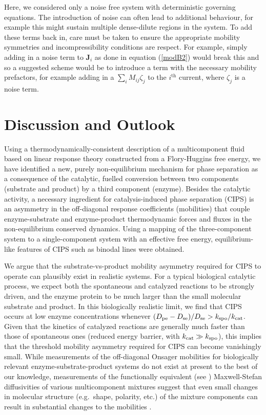 Here, we considered only a noise free system with deterministic governing equations. The introduction of noise can often lead to additional behaviour, for example this might sustain multiple dense-dilute regions in the system. To add these terms back in, care must be taken to ensure the appropriate mobility symmetries and incompressibility conditions are respect. For example, simply adding in a noise term to $\textbf{J}_i$ as done in equation (\ref{modB2}) would break this and so a suggested scheme would be to introduce a term with the necessary mobility prefactors, for example  adding in a $\sum_i M_{ij}\zeta_j$ to the $i^{\text{th}}$ current, where $\zeta_j$ is a noise term.

\section{Discussion and Outlook}

Using a thermodynamically-consistent description of a multicomponent fluid based on linear response theory constructed from a Flory-Huggins free energy, we have identified a new, purely non-equilibrium mechanism for phase separation as a consequence of the catalytic, fuelled conversion between two components (substrate and product) by a third component (enzyme). Besides the catalytic activity, a necessary ingredient for catalysis-induced phase separation (CIPS) is an asymmetry in the off-diagonal response coefficients (mobilities) that couple enzyme-substrate and enzyme-product thermodynamic forces and fluxes in the non-equilibrium conserved dynamics. Using a mapping of the three-component system to a single-component system with an effective free energy, equilibrium-like features of CIPS such as binodal lines were obtained.


We argue that the substrate-vs-product mobility asymmetry required for CIPS to operate can plausibly exist in realistic systems. For a typical biological catalytic process, we expect both the spontaneous and catalyzed reactions to be strongly driven, and the enzyme protein to be much larger than the small molecular substrate and product. In this biologically realistic limit, we find \cite{suppmat} that CIPS occurs at low enzyme concentrations whenever ${(D_{\mathrm{pe}}-D_{\mathrm{se}})}/{D_{\mathrm{se}}} > {k_{\mathrm{spo}}}/{k_{\mathrm{cat}}}$. Given that the kinetics of catalyzed reactions are generally much faster than those of spontaneous ones (reduced energy barrier, with $k_{\mathrm{cat}}\gg k_{\mathrm{spo}}$), this implies that the threshold mobility asymmetry required for CIPS can become vanishingly small. While measurements of the off-diagonal Onsager mobilities for biologically relevant enzyme-substrate-product systems do not exist at present to the best of our knowledge, measurements of the functionally equivalent (see \cite{suppmat}) Maxwell-Stefan diffusivities of various multicomponent mixtures suggest that even small changes in molecular structure (e.g.~shape, polarity, etc.) of the mixture components can result in substantial changes to the mobilities \cite{taylor1993multicomponent,guevara2016mutual,guevara2018interplay,ramm2021diffusiophoretic,vanag2009cross}.




